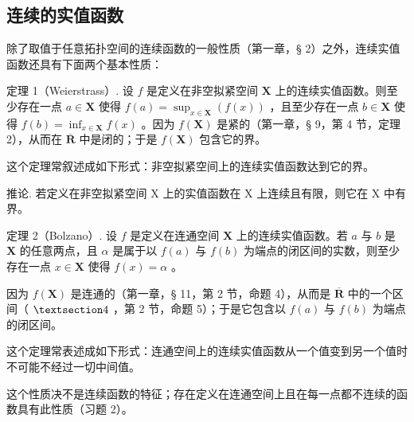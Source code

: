 \subsection{连续的实值函数}

除了取值于任意拓扑空间的连续函数的一般性质（第一章，§ 2）之外，连续实值函数还具有下面两个基本性质：

定理 1（Weierstrass）. 设 \(f\) 是定义在非空拟紧空间 \(\mathbf{X}\) 上的连续实值函数。则至少存在一点 \(a \in \mathbf{X}\) 使得 \(f(a) = \sup_{x \in \mathbf{X}} (f(x))\) ，且至少存在一点 \(b \in \mathbf{X}\) 使得 \(f(b) = \inf_{x \in \mathbf{X}} f(x)\) 。因为 \(f(\mathbf{X})\) 是紧的（第一章，§ 9，第 4 节，定理 2），从而在 \(\overline{\mathbf{R}}\) 中是闭的；于是 \(f(\mathbf{X})\) 包含它的界。

这个定理常叙述成如下形式：非空拟紧空间上的连续实值函数达到它的界。

推论. 若定义在非空拟紧空间 X 上的实值函数在 X 上连续且有限，则它在 X 中有界。

定理 2（Bolzano）. 设 \(f\) 是定义在连通空间 \(\mathbf{X}\) 上的连续实值函数。若 \(a\) 与 \(b\) 是 \(\mathbf{X}\) 的任意两点，且 \(\alpha\) 是属于以 \(f(a)\) 与 \(f(b)\) 为端点的闭区间的实数，则至少存在一点 \(x \in \mathbf{X}\) 使得 \(f(x) = \alpha\) 。

因为 \(f(\mathbf{X})\) 是连通的（第一章，§ 11，第 2 节，命题 4），从而是 \(\overline{\mathbf{R}}\) 中的一个区间（ \(\S 4\) ，第 2 节，命题 5）；于是它包含以 \(f(a)\) 与 \(f(b)\) 为端点的闭区间。

这个定理常表述成如下形式：连通空间上的连续实值函数从一个值变到另一个值时不可能不经过一切中间值。

这个性质决不是连续函数的特征；存在定义在连通空间上且在每一点都不连续的函数具有此性质（习题 2）。

